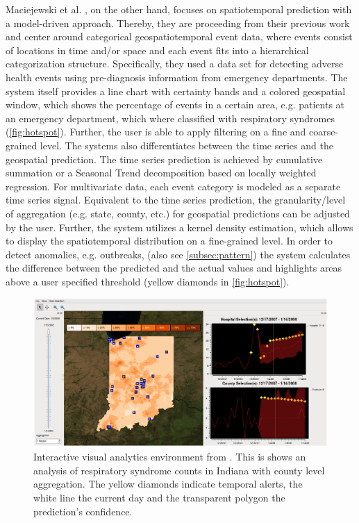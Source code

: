 \documentclass[electronic]{vgtc}             %
\begin{document}
Maciejewski et al. \cite{maciejewski:2011}, on the other hand, focuses on spatiotemporal prediction with a model-driven approach.
Thereby, they are proceeding from their previous work \cite{maciejewski:2008, maciejewski:2007} and center around categorical geospatiotemporal event data, where events consist of locations in time and/or space and each event fits into a hierarchical categorization structure.
Specifically, they used a data set for detecting adverse health events using pre-diagnosis information from emergency departments.
The system itself provides a line chart with certainty bands and a colored geospatial window, which shows the percentage of events in a certain area, e.g. patients at an emergency department, which where classified with respiratory syndromes (\autoref{fig:hotspot}).
Further, the user is able to apply filtering on a fine and coarse-grained level. 
The systems also differentiates between the time series and the geospatial prediction.
The time series prediction is achieved by cumulative summation or a Seasonal Trend decomposition based on locally weighted regression.
For multivariate data, each event category is modeled as a separate time series signal. 
Equivalent to the time series prediction, the granularity/level of aggregation (e.g. state, county, etc.) for geospatial predictions can be adjusted by the user.
Further, the system utilizes a kernel density estimation, which allows to display the spatiotemporal distribution on a fine-grained level.
In order to detect anomalies, e.g. outbreaks, (also see \autoref{subsec:pattern}) the system calculates the difference between the predicted and the actual values and highlights areas above a user specified threshold (yellow diamonds in \autoref{fig:hotspot}).

\begin{figure}[htb]
	\centering
	\includegraphics[width=\columnwidth]{Hotspot}
	\caption{Interactive visual analytics environment from \cite{maciejewski:2011}. 
		This is shows an analysis of respiratory syndrome counts in Indiana with county level aggregation. The yellow diamonds indicate temporal alerts, the white line the current day and the transparent polygon the prediction's confidence.
	}
	\label{fig:hotspot}
\end{figure}
\end{document}
